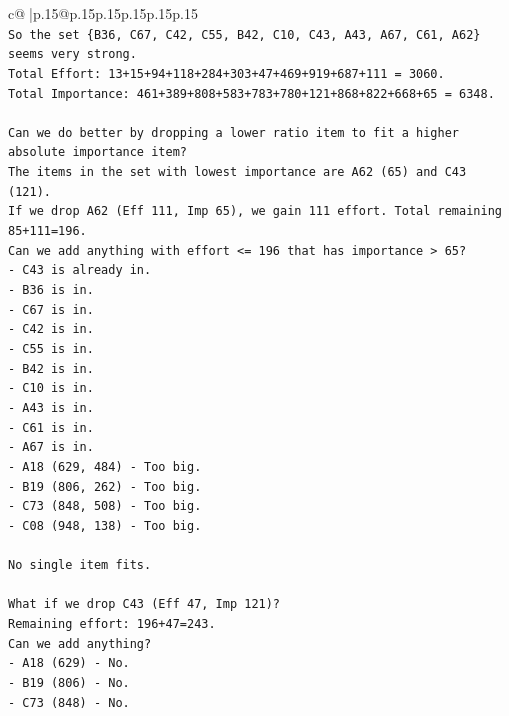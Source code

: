 \documentclass{article}
\begin{document}
{\begin{supertabular}{c@{$\;$}|p{.15\linewidth}@{}p{.15\linewidth}p{.15\linewidth}p{.15\linewidth}p{.15\linewidth}p{.15\linewidth}}
{{{\\ 
\texttt{So the set \{B36, C67, C42, C55, B42, C10, C43, A43, A67, C61, A62\} seems very strong.} \\
\texttt{Total Effort: 13+15+94+118+284+303+47+469+919+687+111 = 3060.} \\
\texttt{Total Importance: 461+389+808+583+783+780+121+868+822+668+65 = 6348.} \\
\\ 
\texttt{Can we do better by dropping a lower ratio item to fit a higher absolute importance item?} \\
\texttt{The items in the set with lowest importance are A62 (65) and C43 (121).} \\
\texttt{If we drop A62 (Eff 111, Imp 65), we gain 111 effort. Total remaining 85+111=196.} \\
\texttt{Can we add anything with effort <= 196 that has importance > 65?} \\
\texttt{{-} C43 is already in.} \\
\texttt{{-} B36 is in.} \\
\texttt{{-} C67 is in.} \\
\texttt{{-} C42 is in.} \\
\texttt{{-} C55 is in.} \\
\texttt{{-} B42 is in.} \\
\texttt{{-} C10 is in.} \\
\texttt{{-} A43 is in.} \\
\texttt{{-} C61 is in.} \\
\texttt{{-} A67 is in.} \\
\texttt{{-} A18 (629, 484) {-} Too big.} \\
\texttt{{-} B19 (806, 262) {-} Too big.} \\
\texttt{{-} C73 (848, 508) {-} Too big.} \\
\texttt{{-} C08 (948, 138) {-} Too big.} \\
\\ 
\texttt{No single item fits.} \\
\\ 
\texttt{What if we drop C43 (Eff 47, Imp 121)?} \\
\texttt{Remaining effort: 196+47=243.} \\
\texttt{Can we add anything?} \\
\texttt{{-} A18 (629) {-} No.} \\
\texttt{{-} B19 (806) {-} No.} \\
\texttt{{-} C73 (848) {-} No.} \\
}}}
\end{supertabular}}
\end{document}
